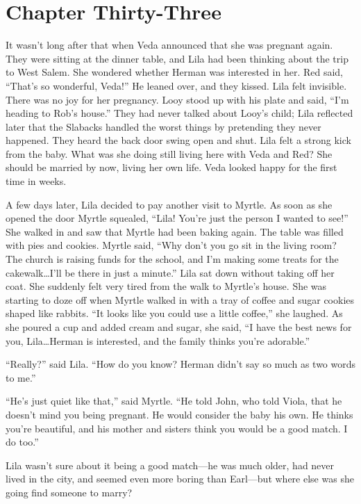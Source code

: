 \documentclass[
  american,
  letterpaper,
]{book}
\begin{document}

\chapter{Chapter Thirty-Three}\label{chapter-thirty-three}

It wasn't long after that when Veda announced that she was pregnant
again. They were sitting at the dinner table, and Lila had been thinking
about the trip to West Salem. She wondered whether Herman was interested
in her. Red said, ``That's so wonderful, Veda!'' He leaned over, and
they kissed. Lila felt invisible. There was no joy for her pregnancy.
Looy stood up with his plate and said, ``I'm heading to Rob's house.''
They had never talked about Looy's child; Lila reflected later that the
Slabacks handled the worst things by pretending they never happened.
They heard the back door swing open and shut. Lila felt a strong kick
from the baby. What was she doing still living here with Veda and Red?
She should be married by now, living her own life. Veda looked happy for
the first time in weeks.

A few days later, Lila decided to pay another visit to Myrtle. As soon
as she opened the door Myrtle squealed, ``Lila! You're just the person I
wanted to see!'' She walked in and saw that Myrtle had been baking
again. The table was filled with pies and cookies. Myrtle said, ``Why
don't you go sit in the living room? The church is raising funds for the
school, and I'm making some treats for the cakewalk\ldots I'll be there
in just a minute.'' Lila sat down without taking off her coat. She
suddenly felt very tired from the walk to Myrtle's house. She was
starting to doze off when Myrtle walked in with a tray of coffee and
sugar cookies shaped like rabbits. ``It looks like you could use a
little coffee,'' she laughed. As she poured a cup and added cream and
sugar, she said, ``I have the best news for you, Lila\ldots Herman is
interested, and the family thinks you're adorable.''

``Really?'' said Lila. ``How do you know? Herman didn't say so much as
two words to me.''

``He's just quiet like that,'' said Myrtle. ``He told John, who told
Viola, that he doesn't mind you being pregnant. He would consider the
baby his own. He thinks you're beautiful, and his mother and sisters
think you would be a good match. I do too.''

Lila wasn't sure about it being a good match---he was much older, had
never lived in the city, and seemed even more boring than Earl---but
where else was she going find someone to marry?
\end{document}
